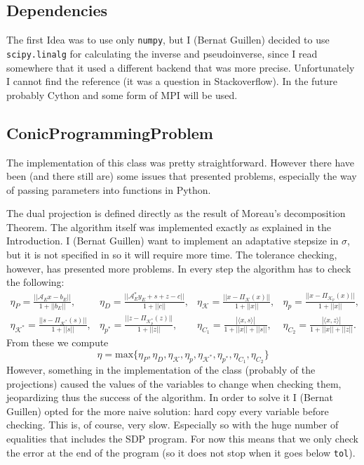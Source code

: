 \documentclass[paper=a4, fontsize=11pt]{scrartcl}
\numberwithin{equation}{section}		%
\numberwithin{figure}{section}			%
\numberwithin{table}{section}				%
\begin{document}
\subsection{Dependencies}
The first Idea was to use only \texttt{numpy}, but I (Bernat Guillen) decided to use \texttt{scipy.linalg} for calculating the inverse and pseudoinverse, since I read somewhere that it used a different backend that was more precise. Unfortunately I cannot find the reference (it was a question in Stackoverflow). In the future probably Cython and some form of MPI will be used.
\subsection{ConicProgrammingProblem\label{sec:cp}}
The implementation of this class was pretty straightforward. However there have been (and there still are) some issues that presented problems, especially the way of passing parameters into functions in Python. 

The dual projection is defined directly as the result of Moreau's decomposition Theorem.
The algorithm itself was implemented exactly as explained in the Introduction. I (Bernat Guillen) want to implement an adaptative stepsize in $\sigma$, but it is not specified in \cite{sun2014} so it will require more time. The tolerance checking, however, has presented more problems. In every step the algorithm has to check the following:
\begin{align*}
\eta_P = \frac{||\mathcal{A}_Ex-b_E||}{1+||b_E||},&\eta_D=\frac{||\mathcal{A}_E^*y_E+s+z-c||}{1+||c||},&\eta_\mathcal{K}=\frac{||x-\Pi_{\mathcal{K}}(x)||}{1+||x||},&\eta_p = \frac{||x-\Pi_{\mathcal{K}_p}(x)||}{1+||x||},&\\
\eta_{\mathcal{K}^*} = \frac{||s-\Pi_{\mathcal{K^*}}(s)||}{1+||s||},&\eta_{p^*} = \frac{||z - \Pi_{\mathcal{K}_p^*}(z)||}{1+||z||},&\eta_{C_1} = \frac{|\langle x,s \rangle|}{1+||x|| +||s||},&\eta_{C_2} = \frac{|\langle x,z \rangle |}{1+||x|| +||z||}.&
\end{align*}
From these we compute $$\eta = \text{max}\{\eta_P,\eta_D,\eta_{\mathcal{K}},\eta_p,\eta_{\mathcal{K}^*}, \eta_{p^*}, \eta_{C_1},\eta_{C_2}\}$$
However, something in the implementation of the class (probably of the projections) caused the values of the variables to change when checking them, jeopardizing thus the success of the algorithm. In order to solve it I (Bernat Guillen) opted for the more naive solution: hard copy every variable before checking. This is, of course, very slow. Especially so with the huge number of equalities that includes the SDP program. For now this means that we only check the error at the end of the program (so it does not stop when it goes below \texttt{tol}). 
\end{document}
